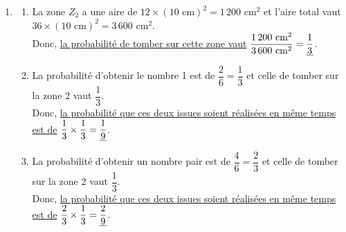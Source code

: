 \begin{activite}
{\begin{enumerate}
\begin{enumerate}
            \end{enumerate}
         \item
            \begin{enumerate}
               \item La zone $Z_2$ a une aire de $12\times(10\text{ cm})^2 =1\,200\text{ cm}^2$ et l'aire total vaut $36\times(10\text{ cm})^2 =3\,600\text{ cm}^2$. \\
                  Donc, \uline{la probabilité de tomber sur cette zone vaut} $\dfrac{1\,200\text{ cm}^2}{3\,600\text{ cm}^2} =\uline{\dfrac13}$.
               \item La probabilité d'obtenir le nombre 1 est de $\dfrac26 =\dfrac13$ et celle de tomber sur la zone 2 vaut $\dfrac13$. \\ [1mm]
                  Donc, \uline{la probabilité que ces deux issues soient réalisées en même temps est de} $\dfrac13\times\dfrac13 =\uline{\dfrac19}$. \smallskip
               \item La probabilité d'obtenir un nombre pair est de $\dfrac46 =\dfrac23$ et celle de tomber sur la zone 2 vaut $\dfrac13$. \\ [1mm]
                  Donc, \uline{la probabilité que ces deux issues soient réalisées en même temps est de} $\dfrac23\times\dfrac13 =\uline{\dfrac29}$.
            \end{enumerate}
      \end{enumerate}}
\end{activite}

\vfill


